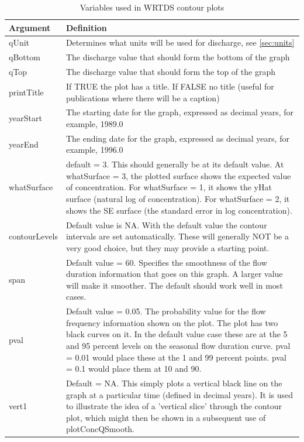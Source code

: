 \documentclass[a4paper,11pt]{article}
\begin{document}
\begin{table}[ht]
\caption{Variables used in WRTDS contour plots  \label{tab:wrtdsContourVariables}}
\begin{tabularx}{\textwidth}{lX}
\hline
  \textbf{Argument} & \textbf{Definition} \\
\hline
qUnit & Determines what units will be used for discharge, see \ref{sec:units}\\
qBottom & The discharge value that should form the bottom of the graph \\
qTop & The discharge value that should form the top of the graph \\
printTitle & If TRUE the plot has a title.  If FALSE no title (useful for publications where there will be a caption) \\
yearStart & The starting date for the graph, expressed as decimal years, for example, 1989.0 \\
yearEnd & The ending date for the graph, expressed as decimal years, for example, 1996.0 \\
whatSurface & default = 3.  This should generally be at its default value.  At whatSurface = 3, the plotted surface shows the expected value of concentration.  For whatSurface = 1, it shows the yHat surface (natural log of concentration).  For whatSurface = 2, it shows the SE surface (the standard error in log concentration).    \\
contourLevels & Default value is NA.  With the default value the contour intervals are set automatically.  These will generally NOT be a very good choice, but they may provide a starting point.  \\
span & Default value = 60.  Specifies the smoothness of the flow duration information that goes on this graph.  A larger value will make it smoother.  The default should work well in most cases.\\
pval & Default value = 0.05.  The probability value for the flow frequency information shown on the plot.  The plot has two black curves on it.  In the default value case these are at the 5 and 95 percent levels on the seasonal flow duration curve.  pval = 0.01 would place these at the 1 and 99 percent points.  pval = 0.1 would place them at 10  and 90.\\
vert1 & Default = NA.  This simply plots a vertical black line on the graph at a particular time (defined in decimal years).  It is used to illustrate the idea of a 'vertical slice' through the contour plot, which might then be shown in a subsequent use of plotConcQSmooth.  \\

\end{tabularx}
\end{table}
\end{document}
